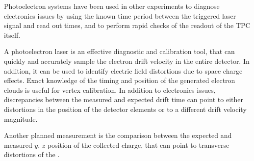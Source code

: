 Photoelectron systems have been used in other experiments to diagnose electronics issues by using the known time period between the triggered laser signal and read out times, and to perform rapid checks of the readout of the TPC itself. 

A photoelectron laser is an effective diagnostic and calibration tool, that can quickly and accurately sample the electron drift velocity in the entire detector.
In addition, it can be used to identify electric field distortions due to space charge effects. Exact knowledge of the timing and position of the generated electron clouds is useful for vertex calibration.
In addition to electronics issues, discrepancies between the measured and expected drift time can point to either distortions in the position of the detector elements or to a different drift velocity magnitude. 

Another planned measurement is the comparison between the expected and measured $y$, $z$ position of the collected charge, that can point to transverse distortions of the \efield.





